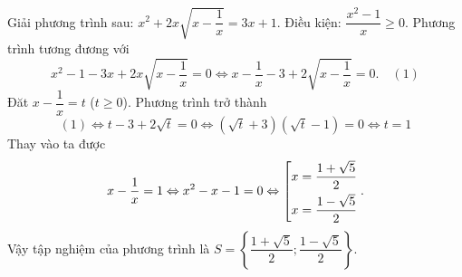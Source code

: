 \begin{ex} %
    Giải phương trình sau: $x^2+2x\sqrt{x-\dfrac{1}{x}}=3x+1$.
\loigiai
    {
    Điều kiện: $\dfrac{x^2-1}{x}\ge 0$. Phương trình tương đương với\\
   $$ x^2-1-3x+2x\sqrt{x-\dfrac{1}{x}}=0
  \Leftrightarrow x-\dfrac{1}{x}-3+2\sqrt{x-\dfrac{1}{x}}=0.\quad (1)$$
    Đăt $x-\dfrac{1}{x}=t$ ($t\ge 0$). Phương trình trở thành
    $$(1)\Leftrightarrow t-3+2\sqrt{t}=0 \Leftrightarrow \left( \sqrt{t}+3\right) \left( \sqrt{t}-1\right) =0 \Leftrightarrow t=1$$
    Thay vào ta được
    $$x-\dfrac{1}{x}=1 \Leftrightarrow x^2-x-1=0\Leftrightarrow
    \left[\begin{aligned}& x=\dfrac{1+\sqrt{5}}{2}\\ & x=\dfrac{1-\sqrt{5}}{2}\end{aligned}\right..$$
    Vậy tập nghiệm của phương trình là $S=\left\lbrace \dfrac{1+\sqrt{5}}{2}; \dfrac{1-\sqrt{5}}{2}\right\rbrace $.
    }
\end{ex}

